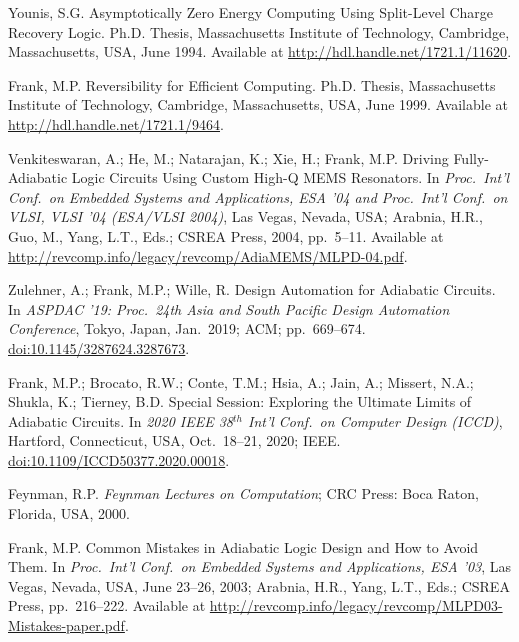 \documentclass[preprints,article,accept,moreauthors,pdftex]{Definitions/mdpi}
\begin{document}
\begin{thebibliography}{999}
Younis, S.G\@. Asymptotically Zero Energy Computing Using Split-Level Charge Recovery Logic. Ph.D. Thesis, Massachusetts Institute of Technology, Cambridge, Massachusetts, USA, June 1994. Available at \href{http://hdl.handle.net/1721.1/11620}{http://hdl.handle.net/1721.1/11620}.

Frank, M.P\@. Reversibility for Efficient Computing. Ph.D. Thesis, Massachusetts Institute of Technology, Cambridge, Massachusetts, USA, June 1999. Available at \href{http://hdl.handle.net/1721.1/9464}{http://hdl.handle.net/1721.1/9464}.

Venkiteswaran, A.; He, M.; Natarajan, K.; Xie, H.; Frank, M.P\@. Driving Fully-Adiabatic Logic Circuits Using Custom High-Q MEMS Resonators. In \emph{Proc.\ Int'l Conf.\ on Embedded Systems and Applications, ESA '04 and Proc.\ Int'l Conf.\ on VLSI, VLSI '04 (ESA/VLSI 2004)}, Las Vegas, Nevada, USA; Arabnia, H.R., Guo, M., Yang, L.T., Eds.; CSREA Press, 2004, pp.~5--11. Available at \href{http://revcomp.info/legacy/revcomp/AdiaMEMS/MLPD-04.pdf}{http://revcomp.info/legacy/revcomp/AdiaMEMS/MLPD-04.pdf}.

Zulehner, A.; Frank, M.P.; Wille, R\@. Design Automation for Adiabatic Circuits. In \emph{ASPDAC '19: Proc.\ 24th Asia and South Pacific Design Automation Conference}, Tokyo, Japan, Jan.\ 2019; ACM; pp.~669--674. \href{https://doi.org/10.1145/3287624.3287673}{doi:10.1145/3287624.3287673}.

Frank, M.P.; Brocato, R.W.; Conte, T.M.; Hsia, A.; Jain, A.; Missert, N.A.; Shukla, K.; Tierney, B.D\@. Special Session: Exploring the Ultimate Limits of Adiabatic Circuits. In \emph{2020 IEEE 38$^{th}$ Int'l Conf.\ on Computer Design (ICCD)}, Hartford, Connecticut, USA, Oct.\ 18--21, 2020; IEEE. \href{https://doi.org/10.1109/ICCD50377.2020.00018}{doi:10.1109/ICCD50377.2020.00018}.

Feynman, R.P\@. \emph{Feynman Lectures on Computation}; CRC Press: Boca Raton, Florida, USA, 2000.

Frank, M.P\@. Common Mistakes in Adiabatic Logic Design and How to Avoid Them. In \emph{Proc.\ Int'l Conf.\ on Embedded Systems and Applications, ESA '03}, Las Vegas, Nevada, USA, June 23--26, 2003; Arabnia, H.R., Yang, L.T., Eds.; CSREA Press, pp.~216--222. Available at \href{http://revcomp.info/legacy/revcomp/MLPD03-Mistakes-paper.pdf}{http://revcomp.info/legacy/revcomp/MLPD03-Mistakes-paper.pdf}.


\end{thebibliography}
\end{document}
